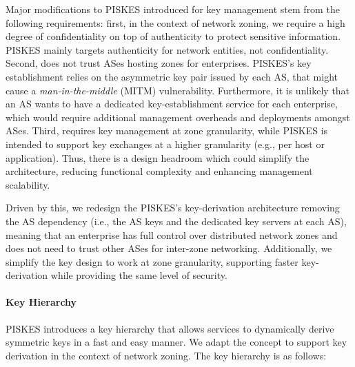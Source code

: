Major modifications to PISKES introduced for \name key management stem from the following requirements: first,
in the context of network zoning, we require a high degree of confidentiality on top of
authenticity to protect sensitive information. PISKES mainly targets authenticity for 
network entities, not confidentiality. Second, \name does not trust ASes hosting zones
for enterprises. PISKES's key establishment relies on the asymmetric key pair issued by
each AS, that might cause a \textit{man-in-the-middle} (MITM) vulnerability. Furthermore, it is unlikely that an AS 
wants to have a dedicated key-establishment service for each enterprise, which would require 
additional management overheads and deployments amongst ASes. Third, \name requires key 
management at zone granularity, while PISKES is intended to support key exchanges at a 
higher granularity (e.g., per host or application). Thus, there is a design headroom which 
could simplify the architecture, reducing functional complexity and enhancing management
scalability.

Driven by this, we redesign the PISKES's key-derivation architecture removing the
AS dependency (i.e., the AS keys and the dedicated key servers at each AS), meaning
that an enterprise has full control over distributed network zones and does not
need to trust other ASes for inter-zone networking. Additionally, we simplify the key 
design to work at zone granularity, supporting faster key-derivation while
providing the same level of security. 

\paragraph{Key Hierarchy}
PISKES introduces a key hierarchy that allows services to dynamically derive symmetric 
keys in a fast and easy manner. We adapt the concept to support key derivation in the 
context of network zoning. The key hierarchy is as follows:

